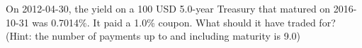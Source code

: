 On 2012-04-30, the yield on a 100 USD 5.0-year Treasury that matured on 2016-10-31 was 0.7014\%. It paid a 1.0\% coupon. What should it have traded for? (Hint: the number of payments up to and including maturity is 9.0)
